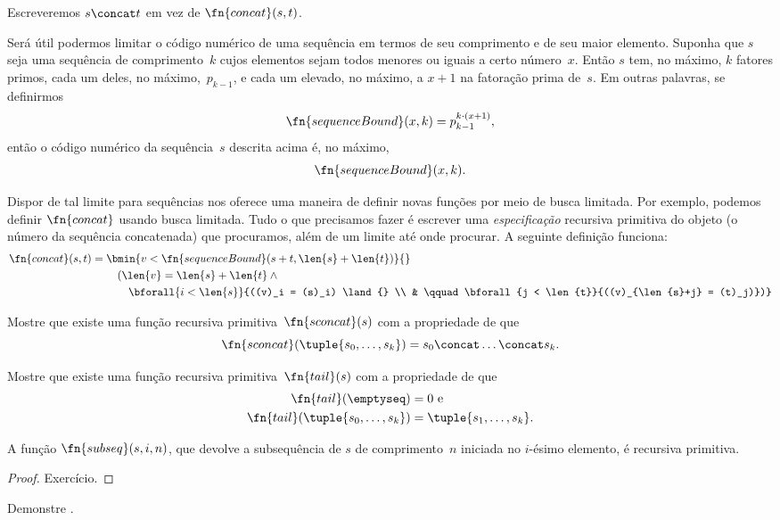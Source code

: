 \documentclass[../../../include/open-logic-section]{subfiles}
\begin{document}
Escreveremos $s \concat t$ em vez de $\fn{concat}(s,t)$.

Será útil podermos limitar o código numérico de uma sequência em termos
de seu comprimento e de seu maior elemento. Suponha que $s$ seja uma
sequência de comprimento~$k$ cujos elementos sejam todos menores ou
iguais a certo número~$x$. Então $s$ tem, no máximo, $k$ fatores primos,
cada um deles, no máximo,~$p_{k-1}$, e cada um elevado, no máximo, a
$x+1$ na fatoração prima de~$s$. Em outras palavras, se definirmos
\[
\fn{sequenceBound}(x,k) = p_{k-1}^{k \cdot (x+1)},
\]
então o código numérico da sequência~$s$ descrita acima é, no máximo,
\[
\fn{sequenceBound}(x,k).
\]

Dispor de tal limite para sequências nos oferece uma maneira de definir
novas funções por meio de busca limitada. Por exemplo, podemos definir
$\fn{concat}$ usando busca limitada. Tudo o que precisamos fazer é
escrever uma \emph{especificação} recursiva primitiva do objeto (o número
da sequência concatenada) que procuramos, além de um limite até onde
procurar. A seguinte definição funciona:
\begin{align*}
  \fn{concat}(s,t) = {} & \bmin{v < \fn{sequenceBound}(s+t,\len{s} +
    \len{t})}{} \\
  & \quad(\len{v} = \len{s} + \len{t} \land {}\\
    & \qquad \bforall{i < \len{s}}{((v)_i = (s)_i) \land {} \\
      & \qquad \bforall{j < \len{t}}{((v)_{\len{s}+j} = (t)_j)})}
\end{align*}

\begin{prob}
Mostre que existe uma função recursiva primitiva~$\fn{sconcat}(s)$
com a propriedade de que
\[
\fn{sconcat}(\tuple{s_0, \dots, s_k}) = s_0 \concat \dots \concat s_k.
\]
\end{prob}

\begin{prob}
Mostre que existe uma função recursiva primitiva~$\fn{tail}(s)$
com a propriedade de que
\begin{align*}
  \fn{tail}(\emptyseq) & = 0 \text{ e}\\
  \fn{tail}(\tuple{s_0, \dots, s_{k}}) & = \tuple{s_1, \dots, s_{k}}.
\end{align*}
\end{prob}

\begin{prop}
  A função $\fn{subseq}(s, i, n)$, que devolve a subsequência
  de $s$ de comprimento~$n$ iniciada no $i$-ésimo elemento, é recursiva
  primitiva.
\end{prop}

\begin{proof}
  Exercício.
\end{proof}

\begin{prob}
  Demonstre .
\end{prob}
  
\end{document}
